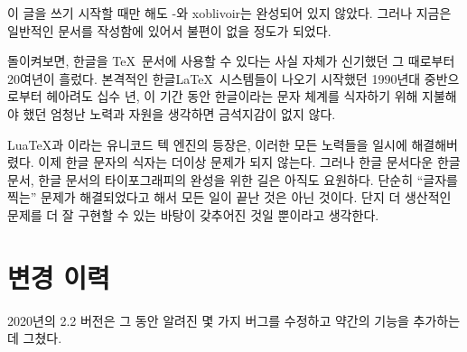 \documentclass[
	12pt,
	a4paper,
	kosection,
	footnote,
	nobookmarks,
	microtype,
]{oblivoir}
\newcommand\xobclass{x\-ob\-liv\-oir\oblivoirallowbreak}
\def\xetexko{\XeTeX-\ko}
\begin{document}
이 글을 쓰기 시작할 때만 해도 \xetexko{}와 \xobclass{}는
완성되어 있지 않았다. 그러나 지금은 일반적인 문서를 작성함에 있어서
불편이 없을 정도가 되었다.

\bigskip

돌이켜보면, 한글을 \TeX\ 문서에 사용할 수 있다는 사실 자체가
신기했던 그 때로부터 20여년이 흘렀다. 본격적인 한글\LaTeX\ 시스템들이
나오기 시작했던 1990년대 중반으로부터 헤아려도 십수 년,
이 기간 동안 한글이라는 문자 체계를 식자하기 위해 지불해야 했던
엄청난 노력과 자원을 생각하면 금석지감이 없지 않다.

Lua\TeX 과 \XeTeX 이라는 유니코드 텍 엔진의 등장은, 이러한 모든
노력들을 일시에 해결해버렸다. 이제 한글 문자의 식자는 더이상
문제가 되지 않는다.
그러나 한글 문서다운 한글 문서, 한글 문서의 타이포그래피의 완성을
위한 길은 아직도 요원하다. 단순히 “글자를 찍는” 문제가 해결되었다고
해서 모든 일이 끝난 것은 아닌 것이다. 단지 더 생산적인 문제를
더 잘 구현할 수 있는 바탕이 갖추어진 것일 뿐이라고 생각한다.


\section{변경 이력}

2020년의 2.2 버전은 그 동안 알려진 몇 가지 버그를 수정하고 약간의 기능을
추가하는 데 그쳤다.





\end{document}

